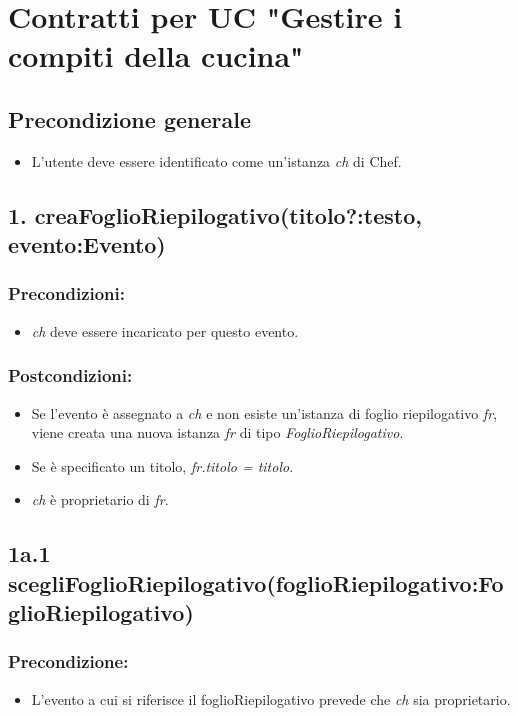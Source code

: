 \section*{Contratti per UC "Gestire i compiti della cucina"}

\subsection*{Precondizione generale}
\begin{itemize}
    \item L'utente deve essere identificato come un'istanza \textit{ch} di Chef.
\end{itemize}

\subsection*{1. creaFoglioRiepilogativo(titolo?:testo, evento:Evento)}

\subsubsection*{Precondizioni:}
\begin{itemize}
    \item \textit{ch} deve essere incaricato per questo evento.
\end{itemize}

\subsubsection*{Postcondizioni:}
\begin{itemize}
    \item Se l'evento è assegnato a \textit{ch} e non esiste un'istanza di foglio riepilogativo \textit{fr}, viene creata una nuova istanza \textit{fr} di tipo \textit{FoglioRiepilogativo}.
    \item Se è specificato un titolo, \textit{fr.titolo = titolo}.
    \item \textit{ch} è proprietario di \textit{fr}.
\end{itemize}

\subsection*{1a.1 scegliFoglioRiepilogativo(foglioRiepilogativo:FoglioRiepilogativo)}

\subsubsection*{Precondizione:}
\begin{itemize}
    \item L'evento a cui si riferisce il foglioRiepilogativo prevede che \textit{ch} sia proprietario.
\end{itemize}

